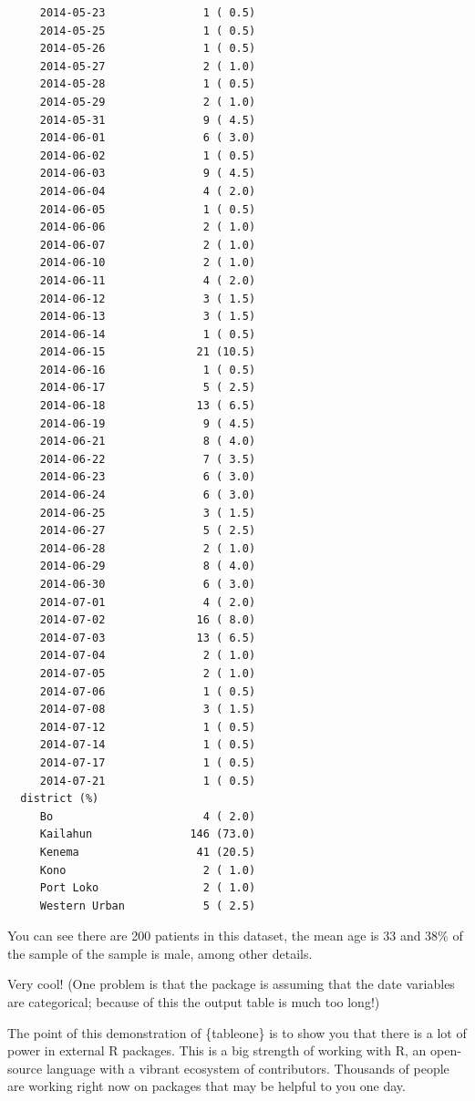 \documentclass[
  letterpaper,
  DIV=11,
  numbers=noendperiod]{scrreprt}
\begin{document}
\begin{verbatim}
     2014-05-23               1 ( 0.5) 
     2014-05-25               1 ( 0.5) 
     2014-05-26               1 ( 0.5) 
     2014-05-27               2 ( 1.0) 
     2014-05-28               1 ( 0.5) 
     2014-05-29               2 ( 1.0) 
     2014-05-31               9 ( 4.5) 
     2014-06-01               6 ( 3.0) 
     2014-06-02               1 ( 0.5) 
     2014-06-03               9 ( 4.5) 
     2014-06-04               4 ( 2.0) 
     2014-06-05               1 ( 0.5) 
     2014-06-06               2 ( 1.0) 
     2014-06-07               2 ( 1.0) 
     2014-06-10               2 ( 1.0) 
     2014-06-11               4 ( 2.0) 
     2014-06-12               3 ( 1.5) 
     2014-06-13               3 ( 1.5) 
     2014-06-14               1 ( 0.5) 
     2014-06-15              21 (10.5) 
     2014-06-16               1 ( 0.5) 
     2014-06-17               5 ( 2.5) 
     2014-06-18              13 ( 6.5) 
     2014-06-19               9 ( 4.5) 
     2014-06-21               8 ( 4.0) 
     2014-06-22               7 ( 3.5) 
     2014-06-23               6 ( 3.0) 
     2014-06-24               6 ( 3.0) 
     2014-06-25               3 ( 1.5) 
     2014-06-27               5 ( 2.5) 
     2014-06-28               2 ( 1.0) 
     2014-06-29               8 ( 4.0) 
     2014-06-30               6 ( 3.0) 
     2014-07-01               4 ( 2.0) 
     2014-07-02              16 ( 8.0) 
     2014-07-03              13 ( 6.5) 
     2014-07-04               2 ( 1.0) 
     2014-07-05               2 ( 1.0) 
     2014-07-06               1 ( 0.5) 
     2014-07-08               3 ( 1.5) 
     2014-07-12               1 ( 0.5) 
     2014-07-14               1 ( 0.5) 
     2014-07-17               1 ( 0.5) 
     2014-07-21               1 ( 0.5) 
  district (%)                         
     Bo                       4 ( 2.0) 
     Kailahun               146 (73.0) 
     Kenema                  41 (20.5) 
     Kono                     2 ( 1.0) 
     Port Loko                2 ( 1.0) 
     Western Urban            5 ( 2.5) 
\end{verbatim}

You can see there are 200 patients in this dataset, the mean age is 33
and 38\% of the sample of the sample is male, among other details.

Very cool! (One problem is that the package is assuming that the date
variables are categorical; because of this the output table is much too
long!)

The point of this demonstration of \{tableone\} is to show you that
there is a lot of power in external R packages. This is a big strength
of working with R, an open-source language with a vibrant ecosystem of
contributors. Thousands of people are working right now on packages that
may be helpful to you one day.
\end{document}
